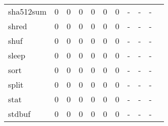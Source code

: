 \begin{longtable}{lp{1.10cm}p{1.10cm}p{1.10cm}p{1.10cm}p{1.10cm}p{1.10cm}p{1.10cm}p{1.10cm}p{1.10cm}p{1.10cm}}
sha512sum &                      0 &                                  0 &                                 0 &                                0 &                                 0 &                               0 &                              - &                                     - &                                   - \\
shred     &                      0 &                                  0 &                                 0 &                                0 &                                 0 &                               0 &                              - &                                     - &                                   - \\
shuf      &                      0 &                                  0 &                                 0 &                                0 &                                 0 &                               0 &                              - &                                     - &                                   - \\
sleep     &                      0 &                                  0 &                                 0 &                                0 &                                 0 &                               0 &                              - &                                     - &                                   - \\
sort      &                      0 &                                  0 &                                 0 &                                0 &                                 0 &                               0 &                              - &                                     - &                                   - \\
split     &                      0 &                                  0 &                                 0 &                                0 &                                 0 &                               0 &                              - &                                     - &                                   - \\
stat      &                      0 &                                  0 &                                 0 &                                0 &                                 0 &                               0 &                              - &                                     - &                                   - \\
stdbuf    &                      0 &                                  0 &                                 0 &                                0 &                                 0 &                               0 &                              - &                                     - &                                   - \\

\end{longtable}
